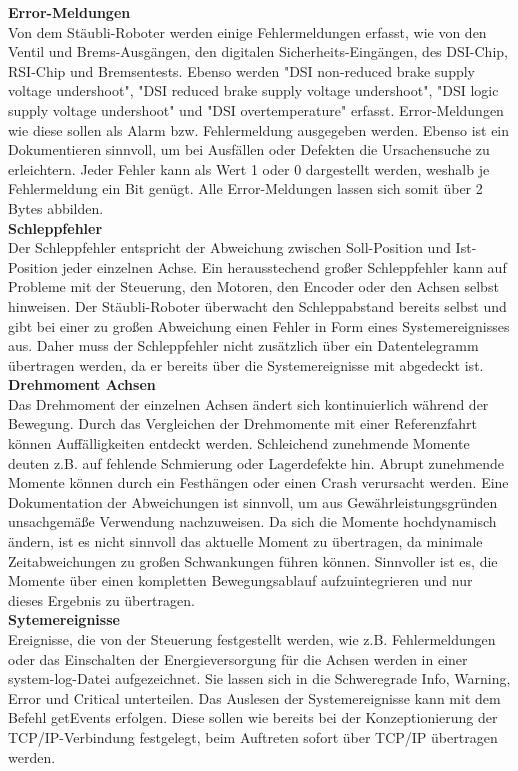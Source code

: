 \documentclass[ a4paper,
                oneside,
                toc=bibliography,
                toc=listof
                ]{scrbook}
\begin{document}
 	\textbf{Error-Meldungen}\\
 	Von dem Stäubli-Roboter werden einige Fehlermeldungen erfasst, wie von den Ventil und Brems-Ausgängen, den digitalen Sicherheits-Eingängen, des DSI-Chip, RSI-Chip und Bremsentests. Ebenso werden "DSI non-reduced brake supply voltage undershoot",  "DSI reduced brake supply voltage undershoot", "DSI logic supply voltage undershoot" und "DSI overtemperature" erfasst. Error-Meldungen wie diese sollen als Alarm bzw. Fehlermeldung ausgegeben werden. Ebenso ist ein Dokumentieren sinnvoll, um bei Ausfällen oder Defekten die Ursachensuche zu erleichtern. Jeder Fehler kann als Wert 1 oder 0 dargestellt werden, weshalb je Fehlermeldung ein Bit genügt. Alle Error-Meldungen lassen sich somit über 2 Bytes abbilden.\\
 	\textbf{Schleppfehler}\\
 	Der Schleppfehler entspricht der Abweichung zwischen Soll-Position und Ist-Position jeder einzelnen Achse. Ein herausstechend großer Schleppfehler kann auf Probleme mit der Steuerung, den Motoren, den Encoder oder den Achsen selbst hinweisen. Der Stäubli-Roboter überwacht den Schleppabstand bereits selbst und gibt bei einer zu großen Abweichung einen Fehler in Form eines Systemereignisses aus. Daher muss der Schleppfehler nicht zusätzlich über ein Datentelegramm übertragen werden, da er bereits über die Systemereignisse mit abgedeckt ist.\\
 	\textbf{Drehmoment Achsen}\\
 	Das Drehmoment der einzelnen Achsen ändert sich kontinuierlich während der Bewegung. Durch das Vergleichen der Drehmomente mit einer Referenzfahrt können  Auffälligkeiten entdeckt werden. Schleichend zunehmende Momente deuten z.B. auf fehlende Schmierung oder Lagerdefekte hin. Abrupt zunehmende Momente können durch ein Festhängen oder einen Crash verursacht werden. Eine Dokumentation der Abweichungen ist sinnvoll, um aus Gewährleistungsgründen unsachgemäße Verwendung nachzuweisen. Da sich die Momente hochdynamisch ändern, ist es nicht sinnvoll das aktuelle Moment zu übertragen, da minimale Zeitabweichungen zu großen Schwankungen führen können. Sinnvoller ist es, die Momente über einen kompletten Bewegungsablauf aufzuintegrieren und nur dieses Ergebnis zu übertragen.\\
	\textbf{Sytemereignisse}\\
	Ereignisse, die von der Steuerung festgestellt werden, wie z.B. Fehlermeldungen oder das Einschalten der Energieversorgung für die Achsen werden in einer system-log-Datei aufgezeichnet. Sie lassen sich in die Schweregrade \glqq Info\grqq{}, \glqq Warning\grqq{}, \glqq Error\grqq{} und \glqq Critical\grqq{} unterteilen. Das Auslesen der Systemereignisse kann mit dem Befehl \glqq getEvents\grqq{} erfolgen. Diese sollen wie bereits bei der Konzeptionierung der TCP/IP-Verbindung festgelegt, beim Auftreten sofort über TCP/IP übertragen werden.\\
\end{document}
